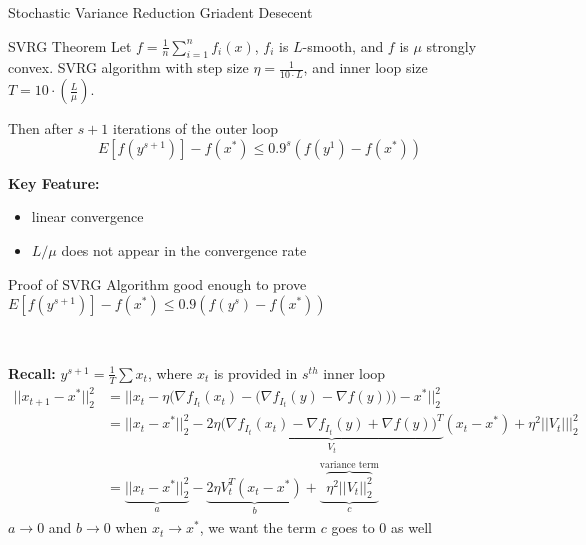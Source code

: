 \documentclass[aspectratio=169,xcolor=dvipsnames]{beamer}
\begin{document}

\begin{frame}{Stochastic Variance Reduction Griadent Desecent}
	\begin{block}{SVRG Theorem}
	Let $f = \frac{1}{n}\sum_{i=1}^n f_i(x)$, $f_i$ is $L$-smooth, and $f$ is $\mu$ strongly convex. SVRG algorithm with step size $\eta = \frac{1}{10 \cdot L}$, and inner loop size $T = 10 \cdot (\frac{L}{\mu})$.
	
	Then after $s+1$ iterations of the outer loop
	\begin{equation*}
		E[f(y^{s+1})] - f(x^*) \le 0.9^s(f(y^1) - f(x^*))
	\end{equation*}
	\end{block}
\textbf{Key Feature:}

\begin{itemize}
	\item linear convergence
	\item $L/\mu$ does not appear in the convergence rate
\end{itemize}	
\end{frame}



\begin{frame}{Proof of SVRG Algorithm}
	good enough to prove $E[f(y^{s+1})] - f(x^*) \le 0.9(f(y^s) - f(x^*))$
	
	\
	
	\textbf{Recall:} $y^{s+1} = \frac{1}{T} \sum x_t$, where $x_t$ is provided in $s^{th}$ inner loop
	\begin{align*}
		\Big|\Big|x_{t+1} - x^*\Big|\Big|_2^2 &= \Big|\Big| x_t - \eta \Big(\nabla f_{I_t}(x_t) - \big(\nabla f_{I_t}(y) - \nabla f(y)\big) \Big) - x^*\Big|\Big|_2^2\\
		& = || x_t - x^*||_2^2 - 2\eta \underbrace{\Big(\nabla f_{I_t}(x_t) -\nabla f_{I_t}(y) + \nabla f(y) \Big)^T}_{V_t}(x_t - x^*) + \eta^2 ||V_t|||_2^2 \\
		& = \underbrace{|| x_t - x^*||_2^2}_{a} - \underbrace{2\eta V_t^T(x_t - x^*)}_{b} + \underbrace{ \overbrace{\eta^2 ||V_t||_2^2}^{\text{variance term}} }_{c}
	\end{align*}
	$a\to 0$ and $b \to 0$ when $x_t \to x^*$, we want the term $c$ goes to 0 as well 
\end{frame}

\end{document}
